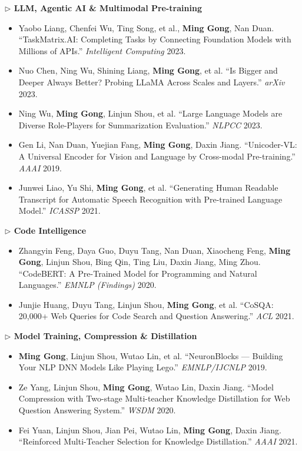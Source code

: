 \documentclass[10.5pt,letterpaper]{article}
\begin{document}
\noindent\textcolor{blue!60!black}{\textbf{$\triangleright$ LLM, Agentic AI \& Multimodal Pre-training}}
\begin{itemize}
  \item Yaobo Liang, Chenfei Wu, Ting Song, et al., \textbf{Ming Gong}, Nan Duan. ``TaskMatrix.AI: Completing Tasks by Connecting Foundation Models with Millions of APIs.'' \textit{Intelligent Computing} 2023.
  \item Nuo Chen, Ning Wu, Shining Liang, \textbf{Ming Gong}, et al. ``Is Bigger and Deeper Always Better? Probing LLaMA Across Scales and Layers.'' \textit{arXiv} 2023.
  \item Ning Wu, \textbf{Ming Gong}, Linjun Shou, et al. ``Large Language Models are Diverse Role-Players for Summarization Evaluation.'' \textit{NLPCC} 2023.
  \item Gen Li, Nan Duan, Yuejian Fang, \textbf{Ming Gong}, Daxin Jiang. ``Unicoder-VL: A Universal Encoder for Vision and Language by Cross-modal Pre-training.'' \textit{AAAI} 2019.
  \item Junwei Liao, Yu Shi, \textbf{Ming Gong}, et al. ``Generating Human Readable Transcript for Automatic Speech Recognition with Pre-trained Language Model.'' \textit{ICASSP} 2021.
\end{itemize}

\noindent\textcolor{blue!60!black}{\textbf{$\triangleright$ Code Intelligence}}
\begin{itemize}
  \item Zhangyin Feng, Daya Guo, Duyu Tang, Nan Duan, Xiaocheng Feng, \textbf{Ming Gong}, Linjun Shou, Bing Qin, Ting Liu, Daxin Jiang, Ming Zhou. ``CodeBERT: A Pre-Trained Model for Programming and Natural Languages.'' \textit{EMNLP (Findings)} 2020.
  \item Junjie Huang, Duyu Tang, Linjun Shou, \textbf{Ming Gong}, et al. ``CoSQA: 20,000+ Web Queries for Code Search and Question Answering.'' \textit{ACL} 2021.
\end{itemize}

\noindent\textcolor{blue!60!black}{\textbf{$\triangleright$ Model Training, Compression \& Distillation}}
\begin{itemize}
  \item \textbf{Ming Gong}, Linjun Shou, Wutao Lin, et al. ``NeuronBlocks --- Building Your NLP DNN Models Like Playing Lego.'' \textit{EMNLP/IJCNLP} 2019.
  \item Ze Yang, Linjun Shou, \textbf{Ming Gong}, Wutao Lin, Daxin Jiang. ``Model Compression with Two-stage Multi-teacher Knowledge Distillation for Web Question Answering System.'' \textit{WSDM} 2020.
  \item Fei Yuan, Linjun Shou, Jian Pei, Wutao Lin, \textbf{Ming Gong}, Daxin Jiang. ``Reinforced Multi-Teacher Selection for Knowledge Distillation.'' \textit{AAAI} 2021.
\end{itemize}
\end{document}
